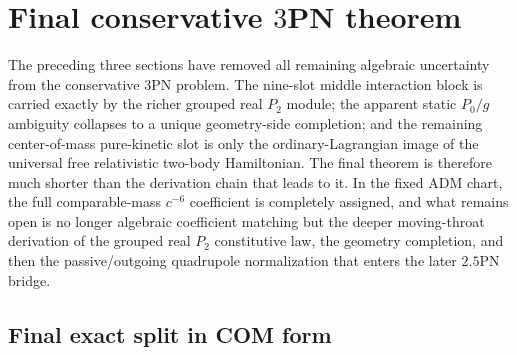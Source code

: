 \documentclass[11pt]{article}
\begin{document}

\section{Final conservative \texorpdfstring{$3$}{3}PN theorem}
\label{sec:final-theorem}

The preceding three sections have removed all remaining algebraic uncertainty from
the conservative $3$PN problem.  The nine-slot middle interaction block is
carried exactly by the richer grouped real $P_2$ module; the apparent static
$P_0/g$ ambiguity collapses to a unique geometry-side completion; and the
remaining center-of-mass pure-kinetic slot is only the ordinary-Lagrangian image
of the universal free relativistic two-body Hamiltonian.  The final theorem is
therefore much shorter than the derivation chain that leads to it.  In the fixed
ADM chart, the full comparable-mass $c^{-6}$ coefficient is completely assigned,
and what remains open is no longer algebraic coefficient matching but the deeper
moving-throat derivation of the grouped real $P_2$ constitutive law, the
geometry completion, and then the passive/outgoing quadrupole normalization that
enters the later $2.5$PN bridge.

\subsection{Final exact split in COM form}
\label{sec:final-com}
\end{document}
